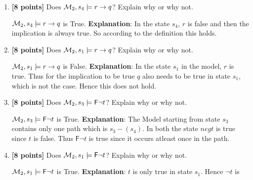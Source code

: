 \documentclass{article}
\def\Sometime{\mathord{\mathsf{F}}}
\begin{document}
\begin{itemize}
\begin{figure}[h]
\begin{center}
\end{center}
\label{f2}
\end{figure}
  \begin{enumerate}
  \item \textbf{[8 points]} Does ${\cal M}_2, s_4 \models r \implies
    q$?  Explain why or why not.
    \begin{answer}
    	${\cal M}_2, s_4 \models r \implies q$ is True. \newline
    	\textbf{Explanation}: In the state $s_4$, $r$ is false and then the
    	implication is always true. So according to the definition this holds.
    \end{answer}
    \bigskip
  \item \textbf{[8 points]} Does ${\cal M}_2, s_1 \models r \implies
    q$?  Explain why or why not.
    \begin{answer}
    	${\cal M}_2, s_1 \models r \implies q$ is False. \newline
    	\textbf{Explanation}: In the state $s_1$ in the model, $r$ is true. Thus
    	for the implication to be true $q$ also needs to be true in state $s_1$,
    	which is not the case. Hence this does not hold.
    \end{answer}
    \bigskip
  \item \textbf{[8 points]} Does ${\cal M}_2, s_3 \models \Sometime
    \neg t$?  Explain why or why not.
    \begin{answer}
    	${\cal M}_2, s_3 \models \Sometime \neg t$ is True. \newline
    	\textbf{Explanation}: The Model starting from state $s_3$ contains only one
    	path which is $s_3-(s_4)$. In both the state $neg t$ is true since $t$ is
    	false. Thus $\Sometime \neg t$ is true since it occurs atleast once in the
    	path.
    \end{answer}
    \newpage
  \item \textbf{[8 points]} Does ${\cal M}_2, s_1 \models \Sometime
    \neg t$?  Explain why or why not.
    \begin{answer}
    	${\cal M}_2, s_1 \models \Sometime \neg t$ is True. \newline
    	\textbf{Explanation}: $t$ is only true in state $s_1$. Hence $\neg t$ is

\end{answer}
\end{enumerate}
\end{itemize}
\end{document}

